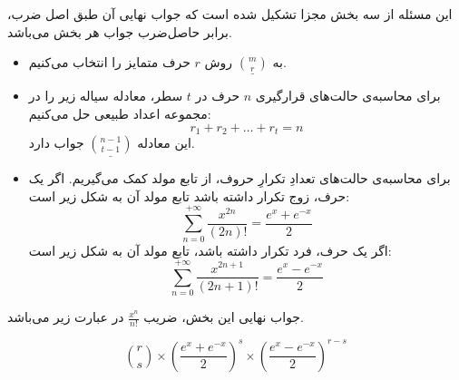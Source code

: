 \p
این مسئله از سه بخش مجزا تشکیل شده است که جواب نهایی آن طبق اصل ضرب، برابر حاصل‌ضرب جواب هر بخش می‌باشد.
\begin{itemize}
\item 
به
$\underline{\binom{m}{r}}$
روش $r$ حرف متمایز را انتخاب می‌کنیم.

\item 
برای محاسبه‌ی حالت‌های قرارگیری 
$n$
حرف در
$t$
سطر، معادله سیاله زیر را در مجموعه اعداد طبیعی حل می‌کنیم: 
$$r_1 + r_2 + \ldots + r_t = n$$
این معادله
$\underline{\binom{n - 1}{t - 1}}$
جواب دارد.

\item
برای محاسبه‌ی حالت‌های تعدادِ تکرارِ حروف، از تابع مولد کمک می‌گیریم.
اگر یک حرف، زوج تکرار داشته باشد تابع مولد آن به شکل زیر است:
\[ \sum_{n=0}^{+\infty} \frac{x^{2n}}{(2n)!} = \frac{e^x + e^{-x}}{2} \]
اگر یک حرف، فرد تکرار داشته باشد، تابع مولد آن به شکل زیر است:
\[ \sum_{n=0}^{+\infty} \frac{x^{2n + 1}}{(2n + 1)!} = \frac{e^x - e^{-x}}{2} \]
\end{itemize}
\p
 جواب نهایی این بخش، ضریب
$\frac{x^n}{n!}$
در عبارت زیر می‌باشد.

\[ \binom{r}{s}\times\left({\frac{e^x + e^{-x}}{2}}\right)^s\times\left({\frac{e^x - e^{-x}}{2}}\right)^{r - s} \]